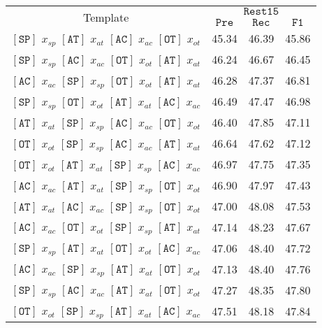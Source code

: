 \documentclass[11pt]{article}
\begin{document}
\begin{table*}[]
\small
    \centering
    \begin{tabular}{c|ccc}
    \toprule
    \multirow{2}{*}{Template} & \multicolumn{3}{c}{$\mathtt{Rest15}$} \\ 
    & $\mathtt{Pre}$ & $\mathtt{Rec}$ & $\mathtt{F1}$ \\
    \midrule
$\mathtt{[SP]}$ $x_{sp}$ $\mathtt{[AT]}$ $x_{at}$ $\mathtt{[AC]}$ $x_{ac}$ $\mathtt{[OT]}$ $x_{ot}$ & 45.34 & 46.39 & 45.86 \\
$\mathtt{[SP]}$ $x_{sp}$ $\mathtt{[AC]}$ $x_{ac}$ $\mathtt{[OT]}$ $x_{ot}$ $\mathtt{[AT]}$ $x_{at}$ & 46.24 & 46.67 & 46.45 \\
$\mathtt{[AC]}$ $x_{ac}$ $\mathtt{[SP]}$ $x_{sp}$ $\mathtt{[OT]}$ $x_{ot}$ $\mathtt{[AT]}$ $x_{at}$ & 46.28 & 47.37 & 46.81 \\
$\mathtt{[SP]}$ $x_{sp}$ $\mathtt{[OT]}$ $x_{ot}$ $\mathtt{[AT]}$ $x_{at}$ $\mathtt{[AC]}$ $x_{ac}$ & 46.49 & 47.47 & 46.98 \\
$\mathtt{[AT]}$ $x_{at}$ $\mathtt{[SP]}$ $x_{sp}$ $\mathtt{[AC]}$ $x_{ac}$ $\mathtt{[OT]}$ $x_{ot}$ & 46.40 & 47.85 & 47.11 \\
$\mathtt{[OT]}$ $x_{ot}$ $\mathtt{[SP]}$ $x_{sp}$ $\mathtt{[AC]}$ $x_{ac}$ $\mathtt{[AT]}$ $x_{at}$ & 46.64 & 47.62 & 47.12 \\
$\mathtt{[OT]}$ $x_{ot}$ $\mathtt{[AT]}$ $x_{at}$ $\mathtt{[SP]}$ $x_{sp}$ $\mathtt{[AC]}$ $x_{ac}$ & 46.97 & 47.75 & 47.35 \\
$\mathtt{[AC]}$ $x_{ac}$ $\mathtt{[AT]}$ $x_{at}$ $\mathtt{[SP]}$ $x_{sp}$ $\mathtt{[OT]}$ $x_{ot}$ & 46.90 & 47.97 & 47.43 \\
$\mathtt{[AT]}$ $x_{at}$ $\mathtt{[AC]}$ $x_{ac}$ $\mathtt{[SP]}$ $x_{sp}$ $\mathtt{[OT]}$ $x_{ot}$ & 47.00 & 48.08 & 47.53 \\
$\mathtt{[AC]}$ $x_{ac}$ $\mathtt{[OT]}$ $x_{ot}$ $\mathtt{[SP]}$ $x_{sp}$ $\mathtt{[AT]}$ $x_{at}$ & 47.14 & 48.23 & 47.67 \\
$\mathtt{[SP]}$ $x_{sp}$ $\mathtt{[AT]}$ $x_{at}$ $\mathtt{[OT]}$ $x_{ot}$ $\mathtt{[AC]}$ $x_{ac}$ & 47.06 & 48.40 & 47.72 \\
$\mathtt{[AC]}$ $x_{ac}$ $\mathtt{[SP]}$ $x_{sp}$ $\mathtt{[AT]}$ $x_{at}$ $\mathtt{[OT]}$ $x_{ot}$ & 47.13 & 48.40 & 47.76 \\
$\mathtt{[SP]}$ $x_{sp}$ $\mathtt{[AC]}$ $x_{ac}$ $\mathtt{[AT]}$ $x_{at}$ $\mathtt{[OT]}$ $x_{ot}$ & 47.27 & 48.35 & 47.80 \\
$\mathtt{[OT]}$ $x_{ot}$ $\mathtt{[SP]}$ $x_{sp}$ $\mathtt{[AT]}$ $x_{at}$ $\mathtt{[AC]}$ $x_{ac}$ & 47.51 & 48.18 & 47.84 \\

\end{tabular}
\end{table*}
\end{document}
